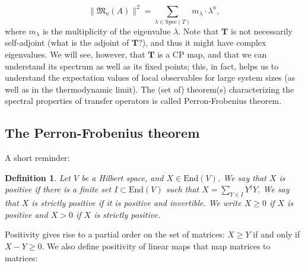 \documentclass{article}
\newtheorem{definition}{Definition}
\newcommand{\End}{\mathrm{End}}
\begin{document}
\begin{equation*}
    \|\mathfrak{M}_n(A)\|^2 = \sum_{\lambda\in \mathrm{Spec}(T)} m_\lambda \cdot \lambda^n,
\end{equation*}
where $m_\lambda$ is the multiplicity of the eigenvalue $\lambda$. Note that $\mathbf{T}$ is not necessarily self-adjoint (what is the adjoint of $\mathbf{T}$?), and thus it might have complex eigenvalues. We will see, however, that $\mathbf{T}$ is a CP map, and that we can understand its spectrum as well as its fixed points; this, in fact, helps us to understand the expectation values of local observables for large system sizes (as well as in the thermodynamic limit). The (set of) theorem(s) characterizing the spectral properties of transfer operators is called Perron-Frobenius theorem. 

\subsection{The Perron-Frobenius theorem}

A short reminder:
\begin{definition}
  Let $V$ be a Hilbert space, and $X\in \End(V)$. We say that $X$ is positive if there is a finite set $ I\subset\End(V)$ such that $X = \sum_{Y\in I} Y^\dagger Y$. We say that $X$ is strictly positive if it is positive and invertible. We write $X\geq 0$ if $X$ is positive and $X>0$ if $X$ is strictly positive.
\end{definition}  
Positivity gives rise to a partial order on the set of matrices: $X\geq Y$ if and only if $X-Y\geq 0$. We also define positivity of linear maps that map matrices to matrices:
\end{document}
